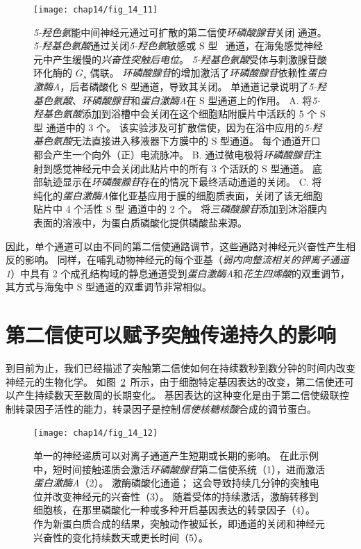 \begin{figure}[htbp]
	\centering
	\texttt{[image: chap14/fig\_14\_11]}
	\caption{\textit{5-羟色氨}能中间神经元通过可扩散的第二信使\textit{环磷酸腺苷}关闭  通道。
		\textit{5-羟基色氨酸}通过关闭\textit{5-羟色氨}敏感或 S 型~ 通道，在海兔感觉神经元中产生缓慢的\textit{兴奋性突触后电位}。
		\textit{5-羟基色氨酸}受体与刺激腺苷酸环化酶的 $ G_s $ 偶联。
		\textit{环磷酸腺苷}的增加激活了\textit{环磷酸腺苷}依赖性\textit{蛋白激酶A}，后者磷酸化 S 型通道，导致其关闭。
		单通道记录说明了\textit{5-羟基色氨酸}、\textit{环磷酸腺苷}和\textit{蛋白激酶A}在 S 型通道上的作用。
		A. 将\textit{5-羟基色氨酸}添加到浴槽中会关闭在这个细胞贴附膜片中活跃的 5 个 S 型  通道中的 3 个。
		该实验涉及可扩散信使，因为在浴中应用的\textit{5-羟基色氨酸}无法直接进入移液器下方膜中的 S 型通道。
		每个通道开口都会产生一个向外（正）电流脉冲\cite{siegelbaum1982serotonin}。
		B. 通过微电极将\textit{环磷酸腺苷}注射到感觉神经元中会关闭此贴片中的所有 3 个活跃的 S 型通道。
		底部轨迹显示在\textit{环磷酸腺苷}存在的情况下最终活动通道的关闭\cite{siegelbaum1982serotonin}。
		C. 将纯化的\textit{蛋白激酶A}催化亚基应用于膜的细胞质表面，关闭了该无细胞贴片中 4 个活性 S 型  通道中的 2 个。
		将\textit{三磷酸腺苷}添加到沐浴膜内表面的溶液中，为蛋白质磷酸化提供磷酸盐来源\cite{shuster1985cyclic}。}
	\label{fig:14_11}
\end{figure}


因此，单个通道可以由不同的第二信使通路调节，这些通路对神经元兴奋性产生相反的影响。
同样，在哺乳动物神经元的每个亚基（\textit{弱内向整流相关的钾离子通道 1}）中具有 2 个成孔结构域的静息通道受到\textit{蛋白激酶A}和\textit{花生四烯酸}的双重调节，其方式与海兔中 S 型通道的双重调节非常相似。



\section{第二信使可以赋予突触传递持久的影响}

到目前为止，我们已经描述了突触第二信使如何在持续数秒到数分钟的时间内改变神经元的生物化学。
如图~\ref{fig:14_12}~所示，由于细胞特定基因表达的改变，第二信使还可以产生持续数天至数周的长期变化。
基因表达的这种变化是由于第二信使级联控制转录因子活性的能力，转录因子是控制\textit{信使核糖核酸}合成的调节蛋白。


\begin{figure}[htbp]
	\centering
	\texttt{[image: chap14/fig\_14\_12]}
	\caption{单一的神经递质可以对离子通道产生短期或长期的影响。
		在此示例中，短时间接触递质会激活\textit{环磷酸腺苷}第二信使系统（1），进而激活\textit{蛋白激酶A}（2）。
		激酶磷酸化通道；
		这会导致持续几分钟的突触电位并改变神经元的兴奋性（3）。
		随着受体的持续激活，激酶转移到细胞核，在那里磷酸化一种或多种开启基因表达的转录因子（4）。
		作为新蛋白质合成的结果，突触动作被延长，即通道的关闭和神经元兴奋性的变化持续数天或更长时间（5）。}
	\label{fig:14_12}
\end{figure}


